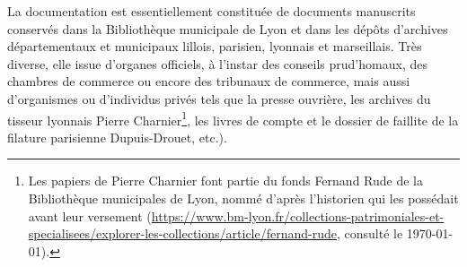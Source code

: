 La documentation est essentiellement constituée de documents manuscrits conservés dans la Bibliothèque municipale de Lyon et dans les dépôts d'archives départementaux et municipaux lillois, parisien, lyonnais et marseillais.  Très diverse, elle issue d'organes officiels, à l'instar des conseils prud'homaux, des chambres de commerce ou encore des tribunaux de commerce, mais aussi d'organismes ou d'individus privés tels que la presse ouvrière, les archives du tisseur lyonnais Pierre Charnier\footnote{Les papiers de Pierre Charnier font partie du fonds \og Fernand Rude \fg{} de la Bibliothèque municipales de Lyon, nommé d'après l'historien qui les possédait avant leur versement (\url{https://www.bm-lyon.fr/collections-patrimoniales-et-specialisees/explorer-les-collections/article/fernand-rude}, consulté le \today).}, les livres de compte et le dossier de faillite de la filature parisienne Dupuis-Drouet, etc.).
